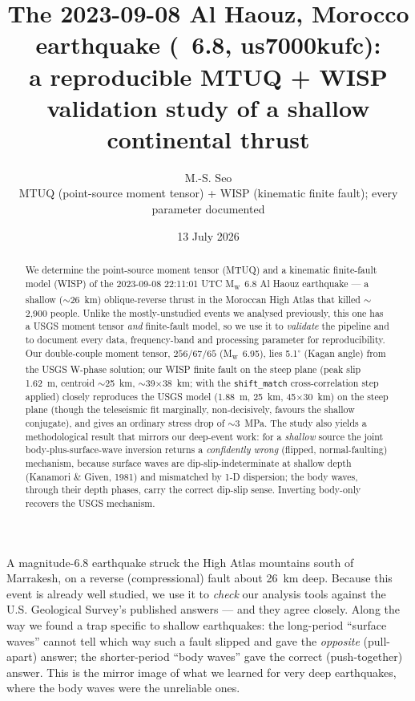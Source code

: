 \documentclass[11pt]{article}
\title{\textbf{The 2023-09-08 Al Haouz, Morocco earthquake (\Mw~6.8, us7000kufc):\\
a reproducible MTUQ + WISP validation study of a shallow continental thrust}}
\author{M.-S. Seo\\ \small MTUQ (point-source moment tensor) + WISP (kinematic finite fault); every parameter documented}
\date{13 July 2026}
\newcommand{\Mw}{M\textsubscript{w}}
\begin{document}
\maketitle

\begin{abstract}
We determine the point-source moment tensor (MTUQ) and a kinematic finite-fault model (WISP)
of the 2023-09-08 22:11:01 UTC \Mw~6.8 Al Haouz earthquake --- a shallow ($\sim$26~km)
oblique-reverse thrust in the Moroccan High Atlas that killed $\sim$2{,}900 people. Unlike the
mostly-unstudied events we analysed previously, this one has a USGS moment tensor \emph{and}
finite-fault model, so we use it to \emph{validate} the pipeline and to document every data,
frequency-band and processing parameter for reproducibility. Our double-couple moment tensor,
$256/67/65$ (\Mw~6.95), lies 5.1$^\circ$ (Kagan angle) from the USGS W-phase solution; our WISP
finite fault on the steep plane (peak slip 1.62~m, centroid $\sim$25~km, $\sim$39$\times$38~km;
with the \texttt{shift\_match} cross-correlation step applied) closely reproduces the USGS model
(1.88~m, 25~km, 45$\times$30~km) on the steep plane (though the teleseismic fit marginally,
non-decisively, favours the shallow conjugate), and gives an ordinary stress drop of $\sim$3~MPa. The study also yields a methodological result that mirrors our deep-event work: for a
\emph{shallow} source the joint body-plus-surface-wave inversion returns a \emph{confidently
wrong} (flipped, normal-faulting) mechanism, because surface waves are dip-slip-indeterminate at
shallow depth (Kanamori \& Given, 1981) and mismatched by 1-D dispersion; the body waves, through
their depth phases, carry the correct dip-slip sense. Inverting body-only recovers the USGS
mechanism.
\end{abstract}

\begin{tcolorbox}[colback=gray!8,colframe=gray!60,title=\textbf{Plain-language summary}]
A magnitude-6.8 earthquake struck the High Atlas mountains south of Marrakesh, on a reverse
(compressional) fault about 26~km deep. Because this event is already well studied, we use it to
\emph{check} our analysis tools against the U.S. Geological Survey's published answers --- and
they agree closely. Along the way we found a trap specific to shallow earthquakes: the
long-period ``surface waves'' cannot tell which way such a fault slipped and gave the
\emph{opposite} (pull-apart) answer; the shorter-period ``body waves'' gave the correct
(push-together) answer. This is the mirror image of what we learned for very deep earthquakes,
where the body waves were the unreliable ones.
\end{tcolorbox}
\end{document}

